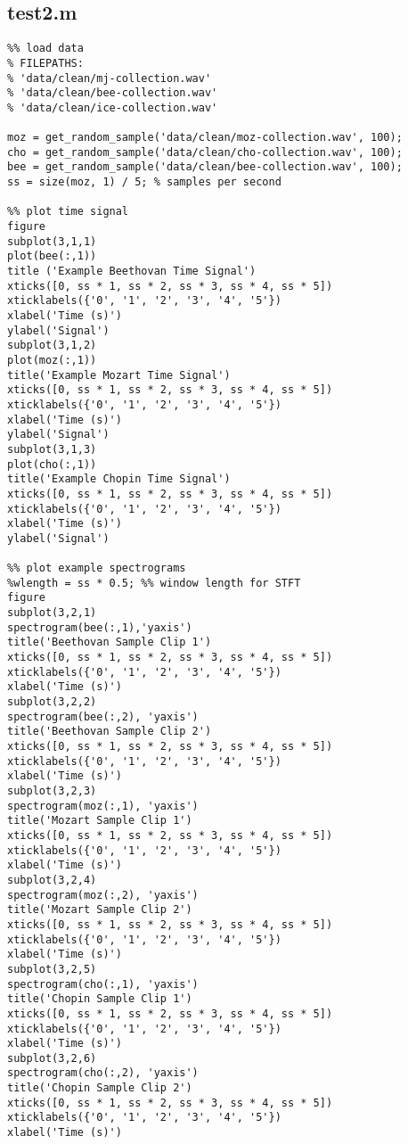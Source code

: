 \documentclass[12pt, a4paper]{article}
\begin{document}
\subsection{test2.m}
\begin{verbatim}
%% load data
% FILEPATHS:
% 'data/clean/mj-collection.wav'
% 'data/clean/bee-collection.wav'
% 'data/clean/ice-collection.wav'

moz = get_random_sample('data/clean/moz-collection.wav', 100);
cho = get_random_sample('data/clean/cho-collection.wav', 100);
bee = get_random_sample('data/clean/bee-collection.wav', 100);
ss = size(moz, 1) / 5; % samples per second

%% plot time signal
figure
subplot(3,1,1)
plot(bee(:,1))
title ('Example Beethovan Time Signal')
xticks([0, ss * 1, ss * 2, ss * 3, ss * 4, ss * 5])
xticklabels({'0', '1', '2', '3', '4', '5'})
xlabel('Time (s)')
ylabel('Signal')
subplot(3,1,2)
plot(moz(:,1))
title('Example Mozart Time Signal')
xticks([0, ss * 1, ss * 2, ss * 3, ss * 4, ss * 5])
xticklabels({'0', '1', '2', '3', '4', '5'})
xlabel('Time (s)')
ylabel('Signal')
subplot(3,1,3)
plot(cho(:,1))
title('Example Chopin Time Signal')
xticks([0, ss * 1, ss * 2, ss * 3, ss * 4, ss * 5])
xticklabels({'0', '1', '2', '3', '4', '5'})
xlabel('Time (s)')
ylabel('Signal')

%% plot example spectrograms
%wlength = ss * 0.5; %% window length for STFT
figure
subplot(3,2,1)
spectrogram(bee(:,1),'yaxis')
title('Beethovan Sample Clip 1')
xticks([0, ss * 1, ss * 2, ss * 3, ss * 4, ss * 5])
xticklabels({'0', '1', '2', '3', '4', '5'})
xlabel('Time (s)')
subplot(3,2,2)
spectrogram(bee(:,2), 'yaxis')
title('Beethovan Sample Clip 2')
xticks([0, ss * 1, ss * 2, ss * 3, ss * 4, ss * 5])
xticklabels({'0', '1', '2', '3', '4', '5'})
xlabel('Time (s)')
subplot(3,2,3)
spectrogram(moz(:,1), 'yaxis')
title('Mozart Sample Clip 1')
xticks([0, ss * 1, ss * 2, ss * 3, ss * 4, ss * 5])
xticklabels({'0', '1', '2', '3', '4', '5'})
xlabel('Time (s)')
subplot(3,2,4)
spectrogram(moz(:,2), 'yaxis')
title('Mozart Sample Clip 2')
xticks([0, ss * 1, ss * 2, ss * 3, ss * 4, ss * 5])
xticklabels({'0', '1', '2', '3', '4', '5'})
xlabel('Time (s)')
subplot(3,2,5)
spectrogram(cho(:,1), 'yaxis')
title('Chopin Sample Clip 1')
xticks([0, ss * 1, ss * 2, ss * 3, ss * 4, ss * 5])
xticklabels({'0', '1', '2', '3', '4', '5'})
xlabel('Time (s)')
subplot(3,2,6)
spectrogram(cho(:,2), 'yaxis')
title('Chopin Sample Clip 2')
xticks([0, ss * 1, ss * 2, ss * 3, ss * 4, ss * 5])
xticklabels({'0', '1', '2', '3', '4', '5'})
xlabel('Time (s)')



\end{verbatim}
\end{document}
